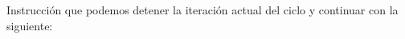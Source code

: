 
\question Instrucción que podemos detener la iteración actual del
          ciclo y continuar con la siguiente: \fillin[continue]
